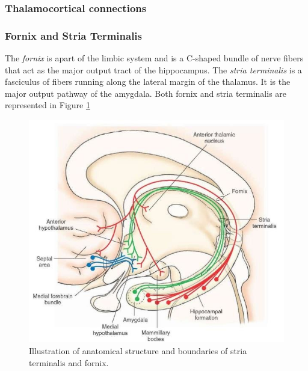     \subsubsection*{Thalamocortical connections}
    

    \subsubsection*{Fornix and Stria Terminalis}
    The \emph{fornix} is apart of the limbic system and is a C-shaped bundle of nerve fibers that act as the major output tract of the hippocampus. \cite{Fornixof88:online}
    The \emph{stria terminalis} is a fasciculus of fibers running along the lateral margin of the thalamus. It is the major output pathway of the amygdala. \cite{DUDAS20211}
    Both fornix and stria terminalis are represented in Figure \ref{fig:fornixST}

    \begin{figure}[h]
      \centering
      \begin{minipage}[c]{0.6\textwidth}
        \includegraphics[width=\textwidth]{images/fornixST.jpg}
      \end{minipage}\hfill
      \begin{minipage}[b]{0.37\textwidth}
          \caption{Illustration of anatomical structure and boundaries of stria terminalis and fornix. \cite{alahmari2021}}
          \label{fig:fornixST}
      \end{minipage}
   \end{figure}
   
